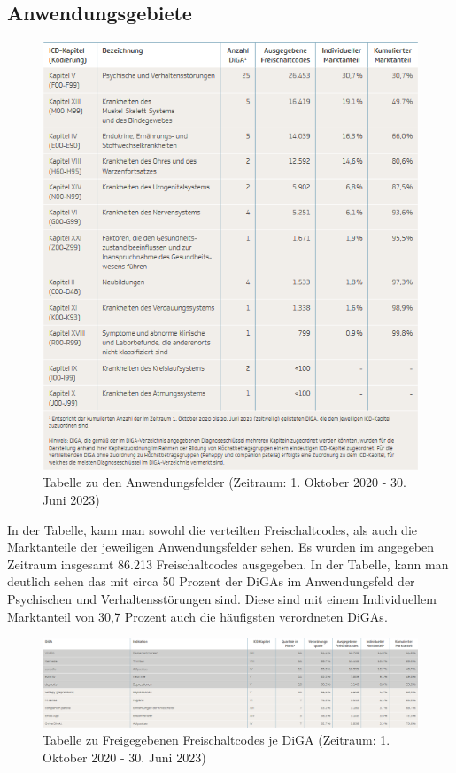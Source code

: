 \documentclass{article}
\begin{document}
		\subsection{Anwendungsgebiete}
			\begin{figure}[htbp]
				\includegraphics[height=0.5\textheight]{./grafiken/tabelle_anwendungsfelder_diga}
				\caption[Anwendungsfelder der DiGA]{Tabelle zu den Anwendungsfelder (Zeitraum: 1. Oktober 2020 - 30. Juni 2023)}
				\label{Tab-anwendungsfelder-diga}
			\end{figure}
			In der Tabelle, kann man sowohl die verteilten Freischaltcodes, als auch die Marktanteile der jeweiligen Anwendungsfelder sehen. Es wurden im angegeben Zeitraum insgesamt 86.213 Freischaltcodes ausgegeben. In der Tabelle, kann man deutlich sehen das mit circa 50 Prozent der DiGAs im Anwendungsfeld der Psychischen und Verhaltensstörungen sind. Diese sind mit einem Individuellem Marktanteil von 30,7 Prozent auch die häufigsten verordneten DiGAs.
			\newpage
			\begin{figure}[htbp]
				\includegraphics[width=\textwidth]{./grafiken/tab_diga_verteilung}
				\caption[Freigegebene Freischaltcode je DiGA]{Tabelle zu Freigegebenen Freischaltcodes je DiGA (Zeitraum: 1. Oktober 2020 - 30. Juni 2023)}
				\label{Tab-freischaltcodes-je-diga}
			\end{figure}
\end{document}
